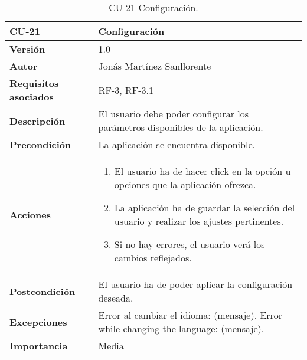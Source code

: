 \begin{table}[p]
	\centering
	\begin{tabularx}{\linewidth}{ p{} p{} }
		\toprule
		\textbf{CU-21}    & \textbf{Configuración}\\
		\toprule
		\textbf{Versión}              & 1.0    \\
		\textbf{Autor}                & Jonás Martínez Sanllorente \\
		\textbf{Requisitos asociados} & RF-3, RF-3.1 \\
		\textbf{Descripción}          & El usuario debe poder configurar los parámetros disponibles de la aplicación. \\
		\textbf{Precondición}         & La aplicación se encuentra disponible. \\
		\textbf{Acciones}             &
		\begin{enumerate}
			\def\labelenumi{\arabic{enumi}.}
			\tightlist
            \item El usuario ha de hacer click en la opción u opciones que la aplicación ofrezca.
			\item La aplicación ha de guardar la selección del usuario y realizar los ajustes pertinentes.
            \item Si no hay errores, el usuario verá los cambios reflejados.
		\end{enumerate}\\
		\textbf{Postcondición}        & El usuario ha de poder aplicar la configuración deseada. \\
		\textbf{Excepciones}          & Error al cambiar el idioma: (mensaje).\newline
                                        Error while changing the language: (mensaje). \\
		\textbf{Importancia}          & Media \\
		\bottomrule
	\end{tabularx}
	\caption{CU-21 Configuración.}
\end{table}


